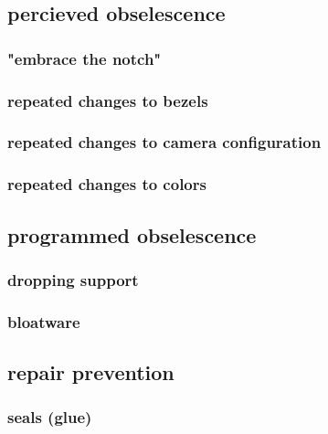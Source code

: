 \documentclass[letterpaper]{article}
\begin{document}
\subsection{percieved obselescence}
\label{sec:org6852902}
\subsubsection{"embrace the notch"}
\label{sec:org685dfbe}
\subsubsection{repeated changes to bezels}
\label{sec:org9e80f0e}
\subsubsection{repeated changes to camera configuration}
\label{sec:org02eb0f4}
\subsubsection{repeated changes to colors}
\label{sec:orge6a759c}
\subsection{programmed obselescence}
\label{sec:orgf8ff038}
\subsubsection{dropping support}
\label{sec:org5e886da}
\subsubsection{bloatware}
\label{sec:org48de219}
\subsection{repair prevention}
\label{sec:orgb6ac4f3}
\subsubsection{seals (glue)}
\label{sec:orgdf18487}
\end{document}
